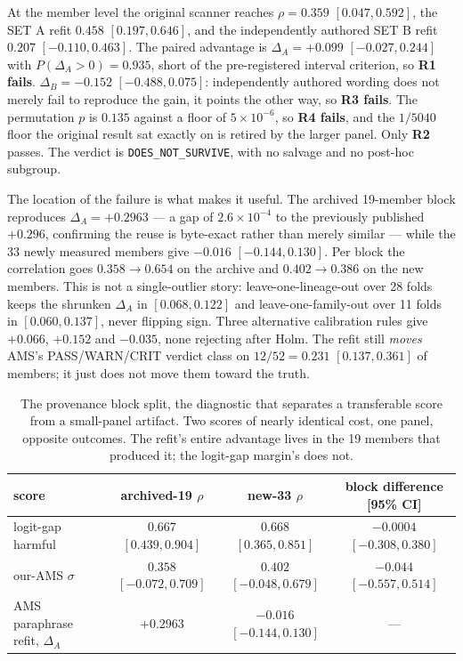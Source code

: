 \documentclass[11pt,letterpaper]{article}
\begin{document}
At the member level the original scanner reaches $\rho = 0.359$ $[0.047, 0.592]$, the SET A refit $0.458$ $[0.197, 0.646]$, and the independently authored SET B refit $0.207$ $[-0.110, 0.463]$. The paired advantage is $\Delta_A = +0.099$ $[-0.027, 0.244]$ with $P(\Delta_A > 0) = 0.935$, short of the pre-registered interval criterion, so \textbf{R1 fails}. $\Delta_B = -0.152$ $[-0.488, 0.075]$: independently authored wording does not merely fail to reproduce the gain, it points the other way, so \textbf{R3 fails}. The permutation $p$ is $0.135$ against a floor of $5\times10^{-6}$, so \textbf{R4 fails}, and the $1/5040$ floor the original result sat exactly on is retired by the larger panel. Only \textbf{R2} passes. The verdict is \texttt{DOES\_NOT\_SURVIVE}, with no salvage and no post-hoc subgroup.

The location of the failure is what makes it useful. The archived 19-member block reproduces $\Delta_A = +0.2963$ --- a gap of $2.6\times10^{-4}$ to the previously published $+0.296$, confirming the reuse is byte-exact rather than merely similar --- while the 33 newly measured members give $-0.016$ $[-0.144, 0.130]$. Per block the correlation goes $0.358 \to 0.654$ on the archive and $0.402 \to 0.386$ on the new members. This is not a single-outlier story: leave-one-lineage-out over 28 folds keeps the shrunken $\Delta_A$ in $[0.068, 0.122]$ and leave-one-family-out over 11 folds in $[0.060, 0.137]$, never flipping sign. Three alternative calibration rules give $+0.066$, $+0.152$ and $-0.035$, none rejecting after Holm. The refit still \emph{moves} AMS's PASS/WARN/CRIT verdict class on $12/52 = 0.231$ $[0.137, 0.361]$ of members; it just does not move them toward the truth.

\begin{table}[!htbp]
\centering
\small
\begin{tabular}{lccc}
\toprule
score & archived-19 $\rho$ & new-33 $\rho$ & block difference [95\% CI] \\
\midrule
logit-gap harmful & $0.667$ $[0.439, 0.904]$ & $0.668$ $[0.365, 0.851]$ & $-0.0004$ $[-0.308, 0.380]$ \\
our-AMS $\sigma$ & $0.358$ $[-0.072, 0.709]$ & $0.402$ $[-0.048, 0.679]$ & $-0.044$ $[-0.557, 0.514]$ \\
AMS paraphrase refit, $\Delta_A$ & $+0.2963$ & $-0.016$ $[-0.144, 0.130]$ & --- \\
\bottomrule
\end{tabular}
\caption{The provenance block split, the diagnostic that separates a transferable score from a small-panel artifact. Two scores of nearly identical cost, one panel, opposite outcomes. The refit's entire advantage lives in the 19 members that produced it; the logit-gap margin's does not.}
\label{tab:block}
\end{table}
\end{document}
